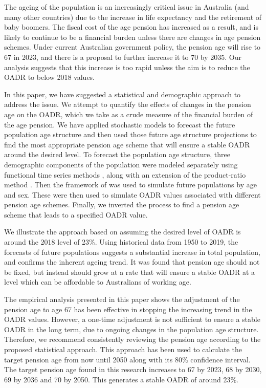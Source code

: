 \documentclass[11pt,a4paper,]{article}
\begin{document}
The ageing of the population is an increasingly critical issue in Australia (and many other countries) due to the increase in life expectancy and the retirement of baby boomers. The fiscal cost of the age pension has increased as a result, and is likely to continue to be a financial burden unless there are changes in age pension schemes. Under current Australian government policy, the pension age will rise to 67 in 2023, and there is a proposal to further increase it to 70 by 2035. Our analysis suggests that this increase is too rapid unless the aim is to reduce the OADR to below 2018 values.

In this paper, we have suggested a statistical and demographic approach to address the issue. We attempt to quantify the effects of changes in the pension age on the OADR, which we take as a crude measure of the financial burden of the age pension. We have applied stochastic models to forecast the future population age structure and then used those future age structure projections to find the most appropriate pension age scheme that will ensure a stable OADR around the desired level. To forecast the population age structure, three demographic components of the population were modeled separately using functional time series methods \autocite{HU07}, along with an extension of the product-ratio method \autocite{HBY13}. Then the framework of \textcite{HB08} was used to simulate future populations by age and sex. These were then used to simulate OADR values associated with different pension age schemes. Finally, we inverted the process to find a pension age scheme that leads to a specified OADR value.

We illustrate the approach based on assuming the desired level of OADR is around the 2018 level of 23\%. Using historical data from 1950 to 2019, the forecasts of future populations suggests a substantial increase in total population, and confirms the inherent ageing trend. It was found that pension age should not be fixed, but instead should grow at a rate that will ensure a stable OADR at a level which can be affordable to Australians of working age.

The empirical analysis presented in this paper shows the adjustment of the pension age to age 67 has been effective in stopping the increasing trend in the OADR values. However, a one-time adjustment is not sufficient to ensure a stable OADR in the long term, due to ongoing changes in the population age structure. Therefore, we recommend consistently reviewing the pension age according to the proposed statistical approach. This approach has been used to calculate the target pension age from now until 2050 along with its 80\% confidence interval. The target pension age found in this research increases to 67 by 2023, 68 by 2030, 69 by 2036 and 70 by 2050. This generates a stable OADR of around 23\%.
\end{document}
